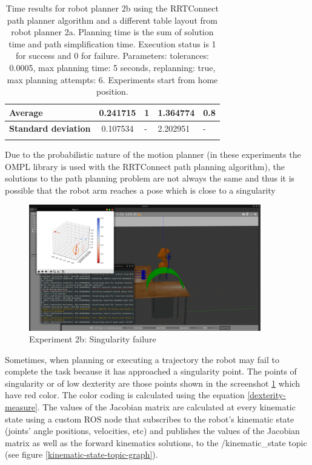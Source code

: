 \begin{longtable}{|p{2cm}|c|p{2cm}|p{2cm}|p{2cm}|}
\hline
\textbf{Average} & 	0.241715  &	1 &	1.364774 &	0.8 \\
\hline
\textbf{Standard deviation} & 	0.107534 &	- &	2.202951 & - \\
\hline
\caption{Time results for robot planner 2b using the RRTConnect path planner algorithm and a different table layout from robot planner 2a. Planning time is the sum of solution time and path simplification time. Execution status is 
1 for success and 0 for failure. Parameters: tolerances: 0.0005, max planning time: 5 seconds, replanning: true, max planning attempts: 6. Experiments start from home position.}
\label{robot-planner2b-rrtconnect-data}
\end{longtable}


Due to the probabilistic nature of the motion planner (in these experiments the OMPL library is used with the RRTConnect path planning algorithm), the solutions 
to the path planning problem are not always the same and thus it is possible that the robot arm reaches a pose which is close to a singularity
\begin{center}
\begin{figure}[!htb]
\centering
\includegraphics[width=0.9\textwidth]{images/robot_planner2b/singularity_failure.png}
\caption{Experiment 2b: Singularity failure}
\label{robot-planner2b-singularity-failure}
\end{figure}
\end{center}

Sometimes, when planning or executing a trajectory the robot may fail to complete the task because it has approached a singularity point. The points of singularity or of low dexterity are those points shown in the screenshot 
\ref{robot-planner2b-singularity-failure} which have red color. The color coding is calculated using the equation \ref{dexterity-measure}. The values of the Jacobian matrix are calculated at every kinematic state using 
a custom ROS node that subscribes to the robot's kinematic state (joints' angle positions, velocities, etc) and publishes the values of the Jacobian matrix as well as the forward kinematics solutions, to the 
/kinematic\_state topic (see figure \ref{kinematic-state-topic-graph}).

